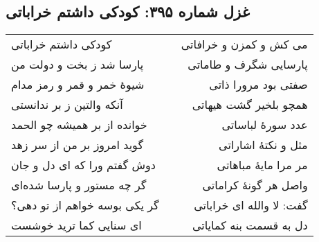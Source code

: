 \begin{center}
\section*{غزل شماره ۳۹۵: کودکی داشتم خراباتی}
\label{sec:395}
\begin{longtable}{l p{0.5cm} r}
کودکی داشتم خراباتی
&&
می کش و کمزن و خرافاتی
\\
پارسا شد ز بخت و دولت من
&&
پارسایی شگرف و طاماتی
\\
شیوهٔ خمر و قمر و رمز مدام
&&
صفتی بود مرورا ذاتی
\\
آنکه والتین ز بر ندانستی
&&
همچو بلخیر گشت هیهاتی
\\
خوانده از بر همیشه چو الحمد
&&
عدد سورهٔ لباساتی
\\
گوید امروز بر من از سر زهد
&&
مثل و نکتهٔ اشاراتی
\\
دوش گفتم ورا که ای دل و جان
&&
مر مرا مایهٔ مباهاتی
\\
گر چه مستور و پارسا شده‌ای
&&
واصل هر گونهٔ کراماتی
\\
گر یکی بوسه خواهم از تو دهی؟
&&
گفت: لا والله ای خراباتی
\\
ای سنایی کما ترید خوشست
&&
دل به قسمت بنه کمایاتی
\\
\end{longtable}
\end{center}
